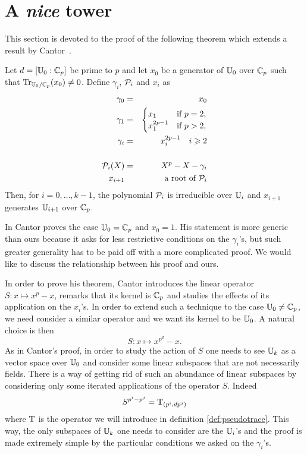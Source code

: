 \section{A \emph{nice} tower}
\label{sec:fast-tower}

This section is devoted to the proof of the following theorem which
extends a result by Cantor~\cite{Can89}.

\begin{theorem}
  \label{th:cantor}
  Let $d=[\mathbb{U}_0 :\mathbb{C}_p]$ be prime to $p$ and let $x_0$ be a generator of
  $\mathbb{U}_0$ over $\mathbb{C}_p$ such that $\operatorname{Tr}_{\mathbb{U}_0/\mathbb{C}_p}(x_0)\ne0$. Define
  $\gamma_i$, $\mathcal{P}_i$ and $x_i$ as
  \begin{eqnarray*}
    \gamma_0 &=& x_0\\
    \gamma_1 &=& 
    \begin{cases}
      x_1        &\text{if $p=2$,}\\
      x_1^{2p-1}      &\text{if $p>2$,}
    \end{cases} \\
    \gamma_i &=&  x_i^{2p-1} \quad i \geqslant 2\\
    \\
    \mathcal{P}_{i}(X) &=& X^p - X - \gamma_i\\
    x_{i+1} &&\text{ a root of } \mathcal{P}_i
  \end{eqnarray*}
  Then, for $i=0,\dots,k-1$, the polynomial $\mathcal{P}_i$ is irreducible
  over $\mathbb{U}_i$ and $x_{i+1}$ generates $\mathbb{U}_{i+1}$ over $\mathbb{C}_p$.
\end{theorem}

In \cite[Theorem 1.2]{Can89} Cantor proves the case $\mathbb{U}_0 = \mathbb{C}_p$ and
$x_0=1$. His statement is more generic than ours because it asks for
less restrictive conditions on the $\gamma_i$'s, but such greater
generality has to be paid off with a more complicated proof. We would
like to discuss the relationship between his proof and ours.

In order to prove his theorem, Cantor introduces the linear operator
$S:x\mapsto x^p-x$, remarks that its kernel is $\mathbb{C}_p$ and studies the effects
of its application on the $x_i$'s. In order to extend such a technique
to the case $\mathbb{U}_0\ne\mathbb{C}_p$, we need consider a similar operator and we
want its kernel to be $\mathbb{U}_0$. A natural choice is then
\[S:x\mapsto x^{p^d}-x\text{.}\]
As in Cantor's proof, in order to study the action of $S$ one needs to
see $\mathbb{U}_k$ as a vector space over $\mathbb{U}_0$ and consider some linear
subspaces that are not necessarily fields. There is a way of getting
rid of such an abundance of linear subspaces by considering only some
iterated applications of the operator $S$. Indeed
\[S^{p^i-p^j} = \operatorname{T}_{(p^i,dp^j)}\]
where $\operatorname{T}$ is the operator we will introduce in definition
\ref{def:pseudotrace}. This way, the only subspaces of $\mathbb{U}_k$ one
needs to consider are the $\mathbb{U}_i$'s and the proof is made extremely
simple by the particular conditions we asked on the $\gamma_i$'s.

